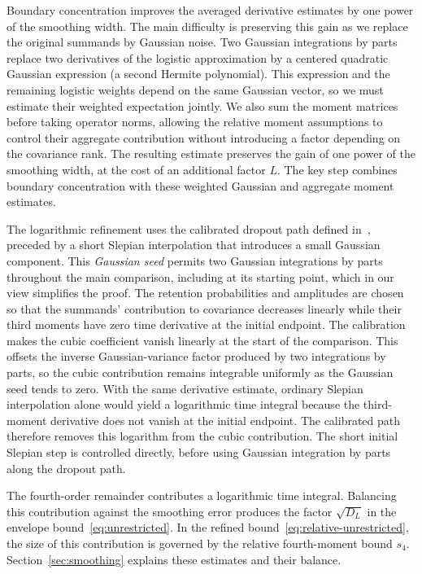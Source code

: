 \documentclass[11pt,letterpaper]{article}
\theoremstyle{remark}
\begin{document}
{Boundary concentration improves the averaged
derivative estimates by one power of the smoothing width. The main
difficulty is preserving this gain as we replace the original summands
by Gaussian noise. Two Gaussian integrations by parts replace two
derivatives of the logistic approximation by a centered quadratic
Gaussian expression (a second Hermite polynomial). This expression and
the remaining logistic weights depend on the same Gaussian vector, so
we must estimate their weighted expectation jointly. We also sum the
moment matrices before taking operator norms, allowing the relative
moment assumptions to control their aggregate contribution without
introducing a factor depending on the covariance rank. The resulting
estimate preserves the gain of one power of the smoothing width, at
the cost of an additional factor \(L\). The key step combines boundary
concentration with these weighted Gaussian and aggregate moment
estimates.}

The logarithmic refinement uses the calibrated dropout path defined
in~\cite[Section~4]{AL}, preceded by a short Slepian interpolation that
introduces a small Gaussian component. {This
\emph{Gaussian seed} permits two Gaussian integrations by parts throughout
the main comparison, including at its starting point, which in our view
simplifies the proof.} The retention probabilities
and amplitudes are chosen so that the summands' contribution to covariance
decreases linearly while their third moments have zero time derivative
at the initial endpoint. {The calibration makes the cubic
coefficient vanish linearly at the start of the comparison. This offsets
the inverse Gaussian-variance factor produced by two integrations by
parts, so the cubic contribution remains integrable uniformly as the
Gaussian seed tends to zero.} {With the same derivative estimate, ordinary
Slepian interpolation alone would yield a logarithmic time integral because the
third-moment derivative does not vanish at the initial endpoint.} The calibrated path therefore removes this
logarithm from the cubic contribution. The short initial Slepian step
is controlled directly, before using Gaussian integration by parts
along the dropout path.

{The fourth-order remainder contributes a logarithmic time integral.
Balancing this contribution against the smoothing error produces the
factor \(\sqrt{D_L}\) in the envelope bound~\eqref{eq:unrestricted}.
In the refined bound~\eqref{eq:relative-unrestricted}, the size of this
contribution is governed by the relative fourth-moment bound \(s_4\).
Section~\ref{sec:smoothing} explains these estimates and their balance.}
\end{document}
